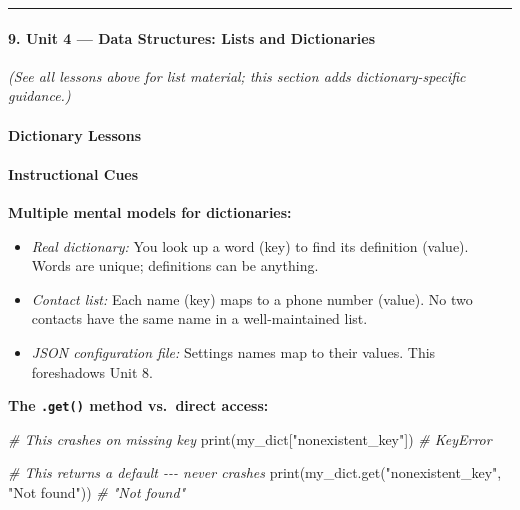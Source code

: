 \documentclass[
  justified,
  openright,
]{tufte-book}
\let\subsection\paragraph
\let\paragraph\paragraph
\newcommand{\StringTok}[1]{\textcolor{CodeString}{#1}}              %
\newcommand{\CommentTok}[1]{\textcolor{CodeComment}{\textit{#1}}}  %
\newenvironment{Shaded}{%
  \begin{mdframed}[style=TufteCode]%
}{%
  \end{mdframed}%
}
\let\subsection\paragraph
\let\paragraph\paragraph
\providecommand{\tightlist}{%
  \setlength{\itemsep}{0pt}\setlength{\parskip}{0pt}}
\begin{document}
\begin{center}\rule{0.5\linewidth}{0.5pt}\end{center}

\subsection{9. Unit 4 --- Data Structures: Lists and
Dictionaries}\label{unit-4-data-structures-lists-and-dictionaries}

\emph{(See all lessons above for list material; this section adds
dictionary-specific guidance.)}

\subsection{Dictionary Lessons}\label{dictionary-lessons}

\paragraph{Instructional Cues}\label{instructional-cues-10}

\textbf{Multiple mental models for dictionaries:}

\begin{itemize}
\tightlist
\item
  \emph{Real dictionary:} You look up a word (key) to find its
  definition (value). Words are unique; definitions can be anything.
\item
  \emph{Contact list:} Each name (key) maps to a phone number (value).
  No two contacts have the same name in a well-maintained list.
\item
  \emph{JSON configuration file:} Settings names map to their values.
  This foreshadows Unit 8.
\end{itemize}

\textbf{The \texttt{.get()} method vs.~direct access:}

\begin{Shaded}
\begin{Highlighting}[]
\CommentTok{\# This crashes on missing key}
print(my\_dict[\StringTok{"nonexistent\_key"}])   \CommentTok{\# KeyError}
 
\CommentTok{\# This returns a default {-}{-}{-} never crashes}
print(my\_dict.get(\StringTok{"nonexistent\_key"}, \StringTok{"Not found"}))  \CommentTok{\# "Not found"}
\end{Highlighting}
\end{Shaded}
\end{document}
